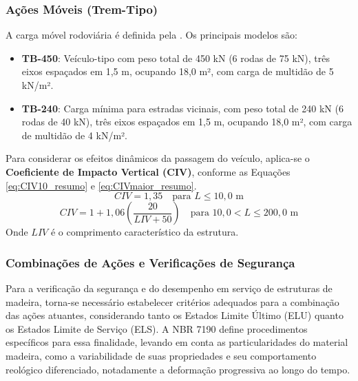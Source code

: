 \subsubsection*{Ações Móveis (Trem-Tipo)}
A carga móvel rodoviária é definida pela \textcite{nbr7188}. Os principais modelos são:
\begin{itemize}
    \item \textbf{TB-450}: Veículo-tipo com peso total de 450 kN (6 rodas de 75 kN), três eixos espaçados em 1,5 m, ocupando 18,0 m², com carga de multidão de 5 kN/m².
    \item \textbf{TB-240}: Carga mínima para estradas vicinais, com peso total de 240 kN (6 rodas de 40 kN), três eixos espaçados em 1,5 m, ocupando 18,0 m², com carga de multidão de 4 kN/m².
\end{itemize}

Para considerar os efeitos dinâmicos da passagem do veículo, aplica-se o \textbf{Coeficiente de Impacto Vertical (CIV)}, conforme as Equações \eqref{eq:CIV10_resumo} e \eqref{eq:CIVmaior_resumo}.
\begin{equation}
CIV = 1{,}35 \quad \text{para } L \leq 10{,}0 \text{ m}
\label{eq:CIV10_resumo}
\end{equation}
\begin{equation}
CIV = 1 + 1{,}06 \left( \frac{20}{LIV + 50} \right) \quad \text{para } 10{,}0 < L \leq 200{,}0 \text{ m}
\label{eq:CIVmaior_resumo}
\end{equation}
Onde $LIV$ é o comprimento característico da estrutura.






\subsubsection{Combinações de Ações e Verificações de Segurança}

Para a verificação da segurança e do desempenho em serviço de estruturas de madeira, torna-se necessário estabelecer critérios adequados para a combinação das ações atuantes, considerando tanto os Estados Limite Último (ELU) quanto os Estados Limite de Serviço (ELS). A NBR 7190 \textcite{NBR7190-1:2022} define procedimentos específicos para essa finalidade, levando em conta as particularidades do material madeira, como a variabilidade de suas propriedades e seu comportamento reológico diferenciado, notadamente a deformação progressiva ao longo do tempo.


